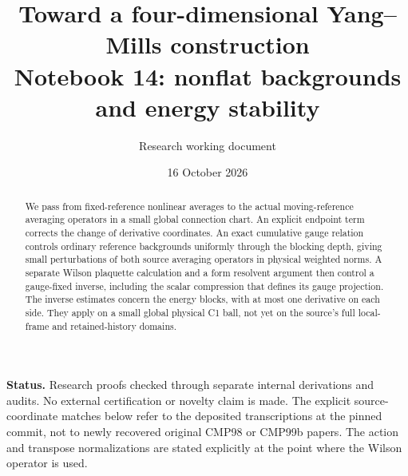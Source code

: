 \documentclass[11pt]{article}
\title{Toward a four-dimensional Yang--Mills construction\\
\large Notebook 14: nonflat backgrounds and energy stability}
\author{Research working document}
\date{16 October 2026}
\theoremstyle{remark}
\begin{document}
\maketitle
\begin{abstract}
We pass from fixed-reference nonlinear averages to the actual
moving-reference averaging operators in a small global connection
chart. An explicit endpoint term corrects the change of derivative
coordinates. An exact cumulative gauge relation controls ordinary
reference backgrounds uniformly through the blocking depth, giving
small perturbations of both source averaging operators in physical
weighted norms. A separate Wilson plaquette calculation and a form
resolvent argument then control a gauge-fixed inverse, including the
scalar compression that defines its gauge projection. The inverse
estimates concern the energy blocks, with at most one derivative on
each side. They apply on a small global physical C1 ball, not yet on
the source's full local-frame and retained-history domains.
\end{abstract}
\noindent\textbf{Status.}
Research proofs checked through separate internal derivations and
audits. No external certification or novelty claim is made. The
explicit source-coordinate matches below refer to the deposited
transcriptions at the pinned commit, not to newly recovered original
CMP98 or CMP99b papers. The action and transpose normalizations are
stated explicitly at the point where the Wilson operator is used.
\end{document}
